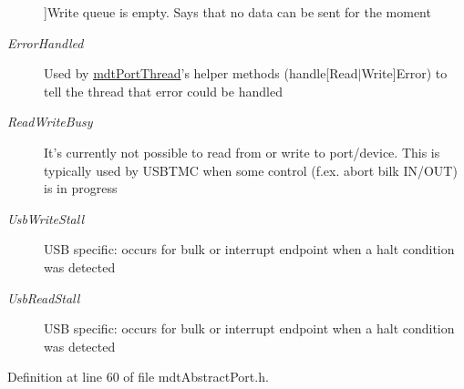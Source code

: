 \begin{Desc}
\begin{description}
{}]Write queue is empty. Says that no data can be sent for the moment \item[{\em 
\hypertarget{classmdt_abstract_port_ad4121bb930c95887e77f8bafa065a85eab0a372501b8916e3953897dc82fd3b3d}{Error\-Handled}\label{classmdt_abstract_port_ad4121bb930c95887e77f8bafa065a85eab0a372501b8916e3953897dc82fd3b3d}
}]Used by \hyperlink{classmdt_port_thread}{mdt\-Port\-Thread}'s helper methods (handle\mbox{[}Read$\vert$\-Write\mbox{]}Error) to tell the thread that error could be handled \item[{\em 
\hypertarget{classmdt_abstract_port_ad4121bb930c95887e77f8bafa065a85ea2d198672405289a1a7e662492ff073f8}{Read\-Write\-Busy}\label{classmdt_abstract_port_ad4121bb930c95887e77f8bafa065a85ea2d198672405289a1a7e662492ff073f8}
}]It's currently not possible to read from or write to port/device. This is typically used by U\-S\-B\-T\-M\-C when some control (f.\-ex. abort bilk I\-N/\-O\-U\-T) is in progress \item[{\em 
\hypertarget{classmdt_abstract_port_ad4121bb930c95887e77f8bafa065a85eaf89af56394b281f71247cd2eb4eaac62}{Usb\-Write\-Stall}\label{classmdt_abstract_port_ad4121bb930c95887e77f8bafa065a85eaf89af56394b281f71247cd2eb4eaac62}
}]U\-S\-B specific\-: occurs for bulk or interrupt endpoint when a halt condition was detected \item[{\em 
\hypertarget{classmdt_abstract_port_ad4121bb930c95887e77f8bafa065a85ea7b3edb569231d6ebd0c933974df60160}{Usb\-Read\-Stall}\label{classmdt_abstract_port_ad4121bb930c95887e77f8bafa065a85ea7b3edb569231d6ebd0c933974df60160}
}]U\-S\-B specific\-: occurs for bulk or interrupt endpoint when a halt condition was detected \end{description}
\end{Desc}


Definition at line 60 of file mdt\-Abstract\-Port.\-h.



